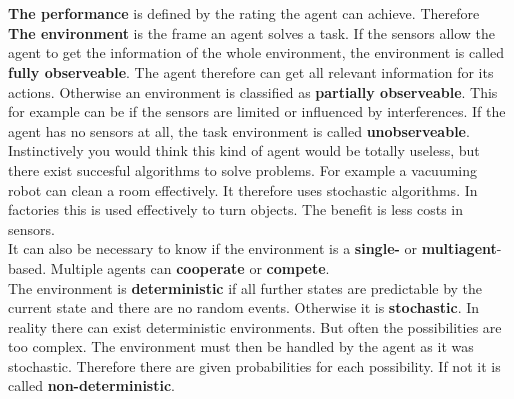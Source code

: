 \documentclass[10pt,a4paper,DIV=11]{scrreprt}
\begin{document}
   \\
\\

\textbf{The performance} is defined by the rating the agent can achieve. Therefore \\

\textbf{The environment} is the frame an agent solves a task.
If the sensors allow the agent to get the information of the whole environment, the environment is called \textbf{fully observeable}. The agent therefore can get all relevant information for its actions. Otherwise an environment is classified as \textbf{partially observeable}. This for example can be if the sensors are limited or influenced by interferences.
If the agent has no sensors at all, the task environment is called \textbf{unobserveable}. Instinctively you would think this kind of agent would be totally useless, but there exist succesful algorithms to solve problems. For example a vacuuming robot can clean a room effectively. It therefore uses stochastic algorithms. In factories this is used effectively to  turn objects. The benefit is less costs in sensors. \\

It can also be necessary to know if the environment is a \textbf{single-} or \textbf{multiagent}-based. Multiple agents can \textbf{cooperate} or \textbf{compete}. \\

The environment is \textbf{deterministic} if all further states are predictable by the current state and there are no random events. Otherwise it is \textbf{stochastic}. In reality there can exist deterministic environments. But often the possibilities are too complex. The environment must then be handled by the agent as it was stochastic. Therefore there are given probabilities for each possibility. If not it is called \textbf{non-deterministic}. \\
\end{document}
